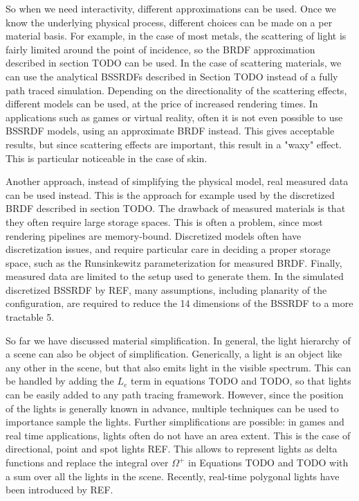 So when we need interactivity, different approximations can be used. Once we know the underlying physical process, different choices can be made on a per material basis. For example, in the case of most metals, the scattering of light is fairly limited around the point of incidence, so the BRDF approximation described in section TODO can be used. In the case of scattering materials, we can use the analytical BSSRDFs described in Section TODO instead of a fully path traced simulation. Depending on the directionality of the scattering effects, different models can be used, at the price of increased rendering times. In applications such as games or virtual reality, often it is not even possible to use BSSRDF models, using an approximate BRDF instead. This gives acceptable results, but since scattering effects are important, this result in a "waxy" effect. This is particular noticeable in the case of skin. 

Another approach, instead of simplifying the physical model, real measured data can be used instead. This is the approach for example used by the discretized BRDF described in section TODO. The drawback of measured materials is that they often require large storage spaces. This is often a problem, since most rendering pipelines are memory-bound. Discretized models often have discretization issues, and require particular care in deciding a proper storage space, such as the Runsinkewitz parameterization for measured BRDF. Finally, measured data are limited to the setup used to generate them. In the simulated discretized BSSRDF by REF, many assumptions, including planarity of the configuration, are required to reduce the 14 dimensions of the BSSRDF to a more tractable 5.  

So far we have discussed material simplification. In general, the light hierarchy of a scene can also be object of simplification. Generically, a light is an object like any other in the scene, but that also emits light in the visible spectrum. This can be handled by adding the $L_e$ term in equations TODO and TODO, so that lights can be easily added to any path tracing framework. However, since the position of the lights is generally known in advance, multiple techniques can be used to importance sample the lights. Further simplifications are possible: in games and real time applications, lights often do not have an area extent. This is the case of directional, point and spot lights REF. This allows to represent lights as delta functions and replace the integral over $\Omega^+$ in Equations TODO and TODO with a sum over all the lights in the scene. Recently, real-time polygonal lights have been introduced by REF.

